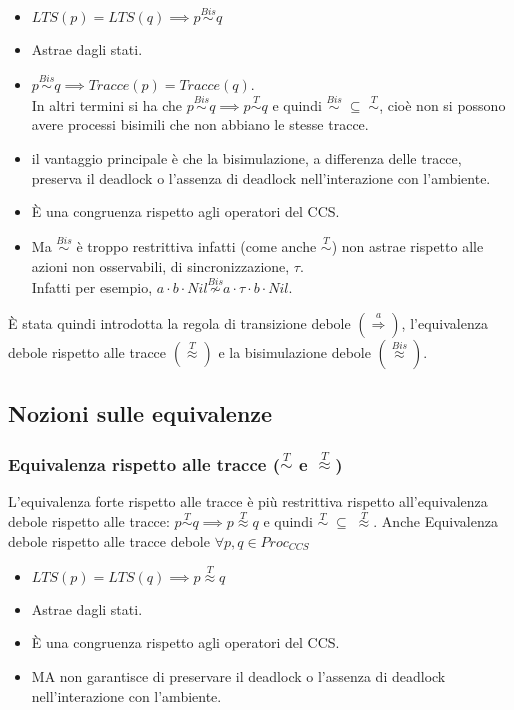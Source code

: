 \begin{itemize}
    \item $LTS(p)=LTS(q)\implies p\stackrel{Bis}\sim q$
    \item Astrae dagli stati.
    \item $p\stackrel{Bis}\sim q \implies Tracce(p)=Tracce(q)$. \\
        In altri termini si ha che $p\stackrel{Bis}\sim q \implies p\stackrel{T}\sim q$ e quindi $\stackrel{Bis}{\sim} \; \subseteq \; \stackrel{T}{\sim}$, cioè non si possono avere processi bisimili che non abbiano le stesse tracce.
    \item il vantaggio principale è che la bisimulazione, a differenza delle tracce, preserva il deadlock o l’assenza di deadlock nell’interazione con l’ambiente.
    \item È una congruenza rispetto agli operatori del CCS. 
    \item Ma  $\stackrel{Bis}\sim$ è troppo restrittiva infatti (come anche $\stackrel{T}\sim$)  non astrae rispetto alle azioni non osservabili, di  sincronizzazione, $\tau$. \\ Infatti per esempio, $a\cdot b\cdot Nil \stackrel{Bis}{\not\sim} a\cdot \tau\cdot b\cdot Nil$. 
\end{itemize}
È stata quindi introdotta la regola di transizione debole $(\stackrel{a}{\Rightarrow})$, l’equivalenza debole rispetto alle tracce $(\stackrel{T}{\approx})$ e la bisimulazione debole $(\stackrel{Bis}{\approx})$.\\
\subsection{Nozioni sulle equivalenze}
\subsubsection{ Equivalenza rispetto alle tracce \texorpdfstring{($\stackrel{T}\sim$ e $\stackrel{T}{\approx}$)}{}}
L’equivalenza forte rispetto alle tracce è più restrittiva rispetto all’equivalenza debole rispetto alle tracce: $p \stackrel{T}\sim q \implies p \stackrel{T}{\approx} q$ e quindi $\stackrel{T}\sim \; \subseteq \;  \stackrel{T}{\approx}$.
Anche Equivalenza debole rispetto alle tracce debole $\forall p,q\in Proc_{CCS}$
\begin{itemize}
    \item $LTS(p)=LTS(q)\implies p \stackrel{T}{\approx} q$
    \item Astrae dagli stati.
    \item È una congruenza rispetto agli operatori del CCS.
    \item MA non garantisce di preservare il deadlock o l’assenza di deadlock nell’interazione con l’ambiente.
\end{itemize}

